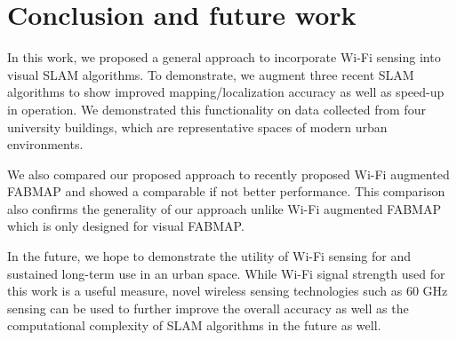 \section{Conclusion and future work}
\label{sec:conc}
In this work, we proposed a general approach to incorporate Wi-Fi sensing into visual SLAM algorithms. To demonstrate, 
we augment three recent SLAM algorithms to show improved mapping/localization accuracy as well as speed-up in operation. 
We demonstrated this functionality on data collected from four university buildings, which are representative spaces of modern urban environments.

We also compared our proposed approach to recently proposed Wi-Fi augmented FABMAP and showed a comparable if not better performance.
This comparison also confirms the generality of our approach unlike Wi-Fi augmented FABMAP which is only designed for visual FABMAP.

In the future, we hope to demonstrate the utility of Wi-Fi sensing for  and sustained long-term use in an urban space. 
While Wi-Fi signal strength used for this work is a useful measure, novel wireless sensing technologies such as 60 GHz sensing can be used to further improve the overall accuracy as well as the computational complexity of SLAM algorithms in the future as well.

